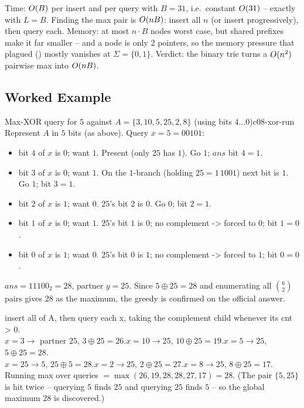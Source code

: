 \begin{complexitybox}
Time: $O(B)$ per insert and per query with $B=31$, i.e.\ constant $O(31)$ -- exactly
 with $L=B$. Finding the max pair is $O(nB)$: insert all $n$ (or insert
progressively), then query each. Memory: at most $n\cdot B$ nodes worst case, but shared prefixes make it
far smaller -- and a node is only $2$ pointers, so the memory pressure that plagued 
() mostly vanishes at $\Sigma=\{0,1\}$. Verdict: the binary trie turns a
$O(n^2)$ pairwise max into $O(nB)$.
\end{complexitybox}

\subsection{Worked Example}

\begin{example}{Max-XOR query for $5$ against $A=\{3,10,5,25,2,8\}$ (using bits $4\ldots 0$)}{c08-xor-run}
Represent $A$ in $5$ bits (as above). Query $x=5=00101$:
\begin{itemize}[nosep]
  \item bit $4$ of $x$ is $0$; want $1$. Present (only $25$ has $1$). Go $1$; $\mathit{ans}$ bit $4=1$.
  \item bit $3$ of $x$ is $0$; want $1$. On the $1$-branch (holding $25{=}1\,1001$) next bit is $1$. Go $1$;
        bit $3=1$.
  \item bit $2$ of $x$ is $1$; want $0$. $25$'s bit $2$ is $0$. Go $0$; bit $2=1$.
  \item bit $1$ of $x$ is $0$; want $1$. $25$'s bit $1$ is $0$; no complement -> forced to $0$; bit $1=0$.
  \item bit $0$ of $x$ is $1$; want $0$. $25$'s bit $0$ is $1$; no complement -> forced to $1$; bit $0=0$.
\end{itemize}
$\mathit{ans}=11100_2=28$, partner $y=25$. Since $5\oplus 25=28$ and enumerating all $\binom{6}{2}$ pairs
gives $28$ as the maximum, the greedy is confirmed on the official answer.
\end{example}
\begin{tracebox}
insert all of A, then query each x, taking the complement child whenever its cnt > 0.\\
$x{=}3\to$ partner $25$, $3\oplus 25=26$.\quad $x{=}10\to 25$, $10\oplus 25=19$.\quad $x{=}5\to 25$, $5\oplus 25=28$.\\
$x{=}25\to 5$, $25\oplus 5=28$.\quad $x{=}2\to 25$, $2\oplus 25=27$.\quad $x{=}8\to 25$, $8\oplus 25=17$.\\
Running max over queries $=\max(26,19,28,28,27,17)=28$. (The pair $\{5,25\}$ is hit twice -- querying $5$
finds $25$ and querying $25$ finds $5$ -- so the global maximum $28$ is discovered.)
\end{tracebox}


